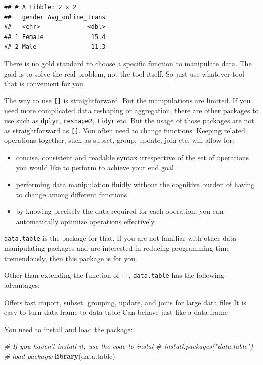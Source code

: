 \documentclass[12pt,]{krantz}
\newenvironment{Shaded}{\begin{snugshade}}{\end{snugshade}}
\newcommand{\KeywordTok}[1]{\textcolor[rgb]{0.13,0.29,0.53}{\textbf{#1}}}
\newcommand{\CommentTok}[1]{\textcolor[rgb]{0.56,0.35,0.01}{\textit{#1}}}
\newcommand{\NormalTok}[1]{#1}
\providecommand{\tightlist}{%
  \setlength{\itemsep}{0pt}\setlength{\parskip}{0pt}}
\theoremstyle{definition}
\theoremstyle{definition}
\theoremstyle{definition}
\theoremstyle{remark}
\begin{document}
\begin{verbatim}
## # A tibble: 2 x 2
##   gender Avg_online_trans
##   <chr>             <dbl>
## 1 Female             15.4
## 2 Male               11.3
\end{verbatim}

There is no gold standard to choose a specific function to manipulate
data. The goal is to solve the real problem, not the tool itself. So
just use whatever tool that is convenient for you.

The way to use \texttt{{[}{]}} is straightforward. But the manipulations
are limited. If you need more complicated data reshaping or aggregation,
there are other packages to use such as \texttt{dplyr},
\texttt{reshape2}, \texttt{tidyr} etc. But the usage of those packages
are not as straightforward as \texttt{{[}{]}}. You often need to change
functions. Keeping related operations together, such as subset, group,
update, join etc, will allow for:

\begin{itemize}
\tightlist
\item
  concise, consistent and readable syntax irrespective of the set of
  operations you would like to perform to achieve your end goal
\item
  performing data manipulation fluidly without the cognitive burden of
  having to change among different functions
\item
  by knowing precisely the data required for each operation, you can
  automatically optimize operations effectively
\end{itemize}

\texttt{data.table} is the package for that. If you are not familiar
with other data manipulating packages and are interested in reducing
programming time tremendously, then this package is for you.

Other than extending the function of \texttt{{[}{]}},
\texttt{data.table} has the following advantages:

Offers fast import, subset, grouping, update, and joins for large data
files It is easy to turn data frame to data table Can behave just like a
data frame

You need to install and load the package:

\begin{Shaded}
\begin{Highlighting}[]
\CommentTok{# If you haven't install it, use the code to instal}
\CommentTok{# install.packages("data.table")}
\CommentTok{# load packagw}
\KeywordTok{library}\NormalTok{(data.table)}
\end{Highlighting}
\end{Shaded}
\end{document}
